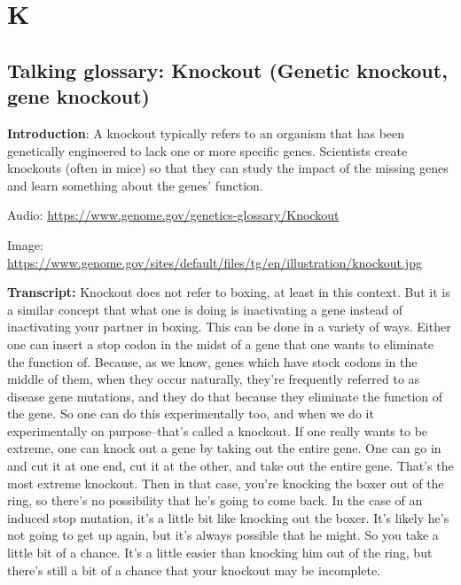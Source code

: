 \documentclass[
]{book}
\begin{document}
\hypertarget{k}{%
\chapter{K}\label{k}}

\hypertarget{talking-glossary-knockout-genetic-knockout-gene-knockout}{%
\section{Talking glossary: Knockout (Genetic knockout, gene knockout)}\label{talking-glossary-knockout-genetic-knockout-gene-knockout}}

\textbf{Introduction}: A knockout typically refers to an organism that has been genetically engineered to lack one or more specific genes. Scientists create knockouts (often in mice) so that they can study the impact of the missing genes and learn something about the genes' function.

Audio: \url{https://www.genome.gov/genetics-glossary/Knockout}

Image: \url{https://www.genome.gov/sites/default/files/tg/en/illustration/knockout.jpg}

\textbf{Transcript:} Knockout does not refer to boxing, at least in this context. But it is a similar concept that what one is doing is inactivating a gene instead of inactivating your partner in boxing. This can be done in a variety of ways. Either one can insert a stop codon in the midst of a gene that one wants to eliminate the function of. Because, as we know, genes which have stock codons in the middle of them, when they occur naturally, they're frequently referred to as disease gene mutations, and they do that because they eliminate the function of the gene. So one can do this experimentally too, and when we do it experimentally on purpose--that's called a knockout. If one really wants to be extreme, one can knock out a gene by taking out the entire gene. One can go in and cut it at one end, cut it at the other, and take out the entire gene. That's the most extreme knockout. Then in that case, you're knocking the boxer out of the ring, so there's no possibility that he's going to come back. In the case of an induced stop mutation, it's a little bit like knocking out the boxer. It's likely he's not going to get up again, but it's always possible that he might. So you take a little bit of a chance. It's a little easier than knocking him out of the ring, but there's still a bit of a chance that your knockout may be incomplete.
\end{document}
